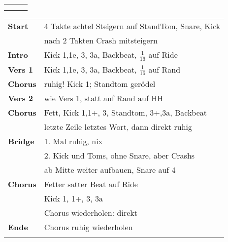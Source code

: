 

\begin{tabular}{p{0.6cm}p{12cm}p{1.4cm}}
	\rowcolor{cyan} \myRow{\thesongnumber} & \myRow{Die Leidenschaft} & \myRow{70} \\
	                                       &                          &            \\
\end{tabular}

\begin{tabular}{p{1.6cm}l}
	\textbf{Start}  & 4 Takte achtel Steigern auf StandTom, Snare, Kick   \\
	                & nach 2 Takten Crash mitsteigern                     \\
	\textbf{Intro}  & Kick 1,1e, 3, 3a, Backbeat, $\frac{1}{16}$ auf Ride \\
	\textbf{Vers 1} & Kick 1,1e, 3, 3a, Backbeat, $\frac{1}{16}$ auf Rand \\
	\textbf{Chorus} & ruhig! Kick 1; Standtom gerödel                     \\
	\textbf{Vers 2} & wie Vers 1, statt auf Rand auf HH                   \\
	\textbf{Chorus} & Fett, Kick 1,1+, 3, Standtom, 3+,3a, Backbeat       \\
	                & letzte Zeile letztes Wort, dann direkt ruhig        \\
	\textbf{Bridge} & 1. Mal ruhig, nix                                   \\
	                & 2. Kick und Toms, ohne Snare, aber Crashs           \\
	                & ab Mitte weiter aufbauen, Snare auf 4               \\
	\textbf{Chorus} & Fetter satter Beat auf Ride                         \\
	                & Kick 1, 1+, 3, 3a                                   \\
	                & Chorus wiederholen: direkt                          \\
	\textbf{Ende}   & Chorus ruhig wiederholen                            \\
	                &                                                     \\
\end{tabular}
